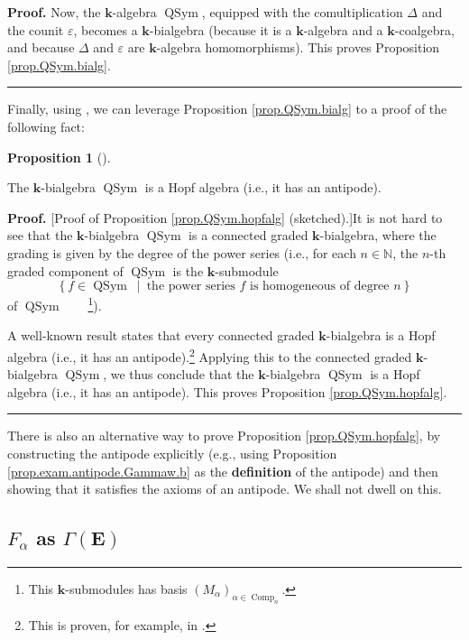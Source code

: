 \documentclass[numbers=enddot,12pt,final,onecolumn,notitlepage,abstracton]{scrartcl}
\theoremstyle{definition}
\newtheorem{prop}[theo]{Proposition}
\newenvironment{proposition}[1][]
{\begin{prop}[#1]\begin{leftbar}}
{\end{leftbar}\end{prop}}
\newenvironment{proof}[1][Proof]{\noindent\textbf{#1.} }{\ \rule{0.5em}{0.5em}}
\newenvironment{verlong}{}{}
\begin{document}
\begin{verlong}
\begin{footnotesize}
\begin{proof}
Now, the $\mathbf{k}$-algebra $\operatorname*{QSym}$, equipped with the
comultiplication $\Delta$ and the counit $\varepsilon$, becomes a $\mathbf{k}%
$-bialgebra (because it is a $\mathbf{k}$-algebra and a $\mathbf{k}%
$-coalgebra, and because $\Delta$ and $\varepsilon$ are $\mathbf{k}$-algebra
homomorphisms). This proves Proposition \ref{prop.QSym.bialg}.
\end{proof}

Finally, using \cite[Proposition 1.4.16]{Reiner}, we can leverage Proposition
\ref{prop.QSym.bialg} to a proof of the following fact:

\begin{proposition}
\label{prop.QSym.hopfalg}The $\mathbf{k}$-bialgebra $\operatorname*{QSym}$ is
a Hopf algebra (i.e., it has an antipode).
\end{proposition}

\begin{proof}
[Proof of Proposition \ref{prop.QSym.hopfalg} (sketched).]It is not hard to
see that the $\mathbf{k}$-bialgebra $\operatorname*{QSym}$ is a connected
graded $\mathbf{k}$-bialgebra, where the grading is given by the degree of the
power series (i.e., for each $n\in\mathbb{N}$, the $n$-th graded component of
$\operatorname*{QSym}$ is the $\mathbf{k}$-submodule%
\[
\left\{  f\in\operatorname*{QSym}\ \mid\ \text{the power series }f\text{ is
homogeneous of degree }n\right\}
\]
of $\operatorname*{QSym}$\ \ \ \ \footnote{This $\mathbf{k}$-submodules has
basis $\left(  M_{\alpha}\right)  _{\alpha\in\operatorname*{Comp}%
\nolimits_{n}}$.}).

A well-known result states that every connected graded $\mathbf{k}$-bialgebra
is a Hopf algebra (i.e., it has an antipode).\footnote{This is proven, for
example, in \cite[Proposition 1.4.16]{Reiner}.} Applying this to the connected
graded $\mathbf{k}$-bialgebra $\operatorname*{QSym}$, we thus conclude that
the $\mathbf{k}$-bialgebra $\operatorname*{QSym}$ is a Hopf algebra (i.e., it
has an antipode). This proves Proposition \ref{prop.QSym.hopfalg}.
\end{proof}

There is also an alternative way to prove Proposition \ref{prop.QSym.hopfalg},
by constructing the antipode explicitly (e.g., using Proposition
\ref{prop.exam.antipode.Gammaw.b} as the \textbf{definition} of the antipode)
and then showing that it satisfies the axioms of an antipode. We shall not
dwell on this.

\subsection{$F_{\alpha}$ as $\Gamma\left(  \mathbf{E}\right)  $}


\end{footnotesize}
\end{verlong}
\end{document}
